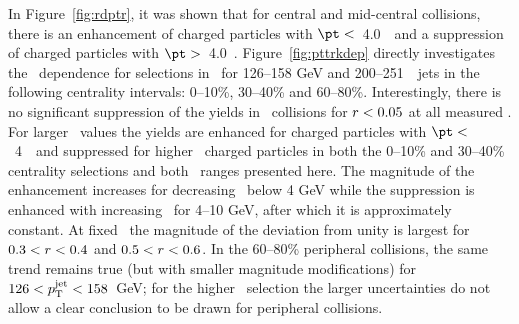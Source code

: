 In Figure~\ref{fig:rdptr}, it was shown that for central and mid-central collisions, there is an enhancement of charged particles with $\pt <$~4.0~\GeV\ and a suppression of charged particles with $\pt >$~4.0~\GeV.
Figure~\ref{fig:pttrkdep} directly investigates the \pt\ dependence for selections in \rvar\  for 126--158 GeV and 200--251~\GeV\ jets in the following centrality intervals: 0--10\%, 30--40\% and 60--80\%.
Interestingly, there is no significant suppression of the yields in \pbpb\ collisions for $\mbox{$r$} < 0.05$ at all measured \pt.
For larger \rvar\ values the yields are enhanced for charged particles with $\pt <$~4~\GeV\ and suppressed for higher \pt\ charged particles in both the 0--10\% and 30--40\% centrality selections and both \ptjet\  ranges presented here.
The magnitude of the enhancement increases for decreasing \pt\ below 4 GeV while the suppression is enhanced with increasing \pt\ for 4--10 GeV, after which it is approximately constant.
At fixed \pt\ the magnitude of the deviation from unity is largest for $0.3< \mbox{$r$} < 0.4$ and $0.5< \mbox{$r$} < 0.6$.
In the 60--80\% peripheral collisions, the same trend remains true (but with smaller magnitude modifications) for \mbox{$126 < \mbox{$p_{\mathrm{T}}^{\mathrm{jet}}$} < 158$ GeV}; for the higher \ptjet\ selection the larger uncertainties do not allow a clear conclusion to be drawn for peripheral collisions.

